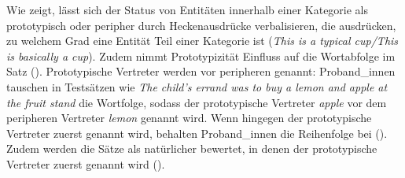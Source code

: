 Wie \textcite{Lakoff.1973} zeigt, lässt sich der Status von Entitäten innerhalb einer Kategorie als prototypisch oder peripher durch Heckenausdrücke verbalisieren, die ausdrücken, zu welchem Grad eine Entität Teil einer Kategorie ist (\textit{This is a typical cup/This is basically a cup}). Zudem nimmt Prototypizität Einfluss auf die Wortabfolge im Satz (\cite{Kelly.1986}). Prototypische Vertreter werden vor peripheren genannt: Proband\_innen tauschen in Testsätzen wie \textit{The child's errand was to buy a lemon and apple at the fruit stand} die Wortfolge, sodass der prototypische Vertreter \textit{apple} vor dem peripheren Vertreter \textit{lemon} genannt wird. Wenn hingegen der prototypische Vertreter zuerst genannt wird, behalten Proband\_innen die Reihenfolge bei (\cite[66--67]{Kelly.1986}). Zudem werden die Sätze als natürlicher bewertet, in denen der prototypische Vertreter zuerst genannt wird (\cite[68]{Kelly.1986}). 

